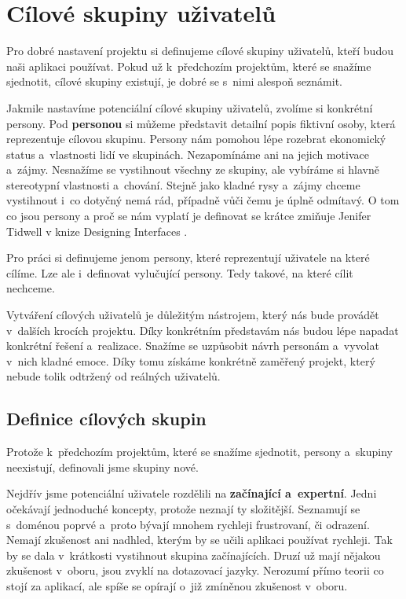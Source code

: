 \chapter{Cílové skupiny uživatelů}

Pro dobré nastavení projektu si definujeme cílové skupiny uživatelů, kteří budou naši aplikaci používat. Pokud už k~předchozím projektům, které se snažíme sjednotit, cílové skupiny existují, je dobré se s~nimi alespoň seznámit.

Jakmile nastavíme potenciální cílové skupiny uživatelů, zvolíme si konkrétní persony. Pod \textbf{personou} si můžeme představit detailní popis fiktivní osoby, která reprezentuje cílovou skupinu. Persony nám pomohou lépe rozebrat ekonomický status a~vlastnosti lidí ve skupinách. Nezapomínáme ani na jejich motivace a~zájmy. Nesnažíme se vystihnout všechny ze skupiny, ale vybíráme si hlavně stereotypní vlastnosti a~chování. Stejně jako kladné rysy a~zájmy chceme vystihnout i~co dotyčný nemá rád, případně vůči čemu je úplně odmítavý. O tom co jsou persony a proč se nám vyplatí je definovat se krátce zmiňuje Jenifer Tidwell v knize Designing Interfaces \cite{Designing_ifaces_2nd_edition}.

Pro práci si definujeme jenom persony, které reprezentují uživatele na které cílíme. Lze ale i~definovat vylučující persony. Tedy takové, na které cílit nechceme.

Vytváření cílových uživatelů je důležitým nástrojem, který nás bude provádět v~dalších krocích projektu. Díky konkrétním představám nás budou lépe napadat konkrétní řešení a~realizace. Snažíme se uzpůsobit návrh personám a~vyvolat v~nich kladné emoce. Díky tomu získáme konkrétně zaměřený projekt, který nebude tolik odtržený od reálných uživatelů.

\section{Definice cílových skupin}

Protože k~předchozím projektům, které se snažíme sjednotit, persony a~skupiny neexistují, definovali jsme skupiny nové.

Nejdřív jsme potenciální uživatele rozdělili na \textbf{začínající a~expertní}. Jedni očekávají jednoduché koncepty, protože neznají ty složitější. Seznamují se s~doménou poprvé a~proto bývají mnohem rychleji frustrovaní, či odrazení. Nemají zkušenost ani nadhled, kterým by se učili aplikaci používat rychleji. Tak by se dala v~krátkosti vystihnout skupina začínajících. Druzí už mají nějakou zkušenost v~oboru, jsou zvyklí na dotazovací jazyky. Nerozumí přímo teorii co stojí za aplikací, ale spíše se opírají o~již zmíněnou zkušenost v~oboru.

